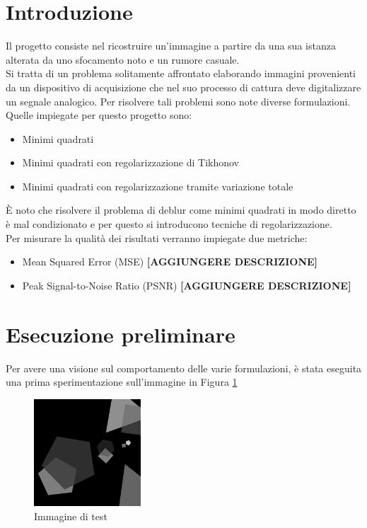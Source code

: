 \documentclass[11pt]{article}
\begin{document}
\section*{Introduzione}
Il progetto consiste nel ricostruire un'immagine a partire da una sua istanza alterata da uno sfocamento noto e un rumore casuale.\\
Si tratta di un problema solitamente affrontato elaborando immagini provenienti da un dispositivo di acquisizione che nel suo processo di cattura deve digitalizzare un segnale analogico. 
Per risolvere tali problemi sono note diverse formulazioni. Quelle impiegate per questo progetto sono:
\begin{itemize}
    \setlength\itemsep{0.05cm}
    \item Minimi quadrati
    \item Minimi quadrati con regolarizzazione di Tikhonov
    \item Minimi quadrati con regolarizzazione tramite variazione totale
\end{itemize}
È noto che risolvere il problema di deblur come minimi quadrati in modo diretto è mal condizionato e per questo si introducono tecniche di regolarizzazione.\\
Per misurare la qualità dei risultati verranno impiegate due metriche:
\begin{itemize}
    \setlength\itemsep{0.05cm}
    \item Mean Squared Error (MSE) \textbf{[AGGIUNGERE DESCRIZIONE]}
    \item Peak Signal-to-Noise Ratio (PSNR) \textbf{[AGGIUNGERE DESCRIZIONE]}
\end{itemize}

\section*{Esecuzione preliminare}
Per avere una visione sul comportamento delle varie formulazioni, è stata eseguita una prima sperimentazione sull'immagine in Figura \ref{fig:originale1}
\begin{figure}[H]
    \centering
    \includegraphics[width=4cm]{originale1.png}
    \caption{Immagine di test}
    \label{fig:originale1}
\end{figure}
\end{document}
